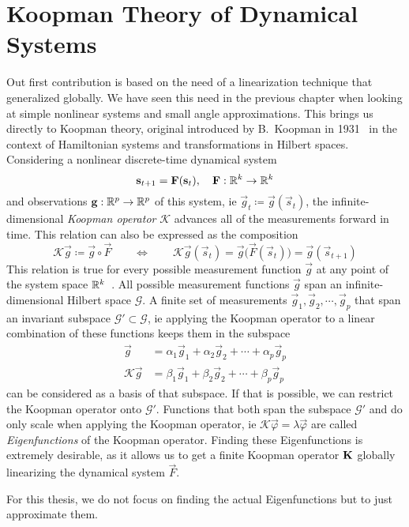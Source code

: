 \chapter{Koopman Theory of Dynamical Systems}
\label{c:koopmanTheoryOfDynamicalSystems}



Out first contribution is based on the need of a linearization technique that generalized globally. We have seen this need in the previous chapter when looking at simple nonlinear systems and small angle approximations. This brings us directly to Koopman theory, original introduced by B.~Koopman in 1931~\cite{koopmanHamiltonianSystemsTransformation1931} in the context of Hamiltonian systems and transformations in Hilbert spaces. Considering a nonlinear discrete-time dynamical system
\begin{equation*}
	\boldsymbol{\mathrm{s}}_{t + 1} = \boldsymbol{\mathrm{F}}(\boldsymbol{\mathrm{s}}_t),\quad \boldsymbol{\mathrm{F}} : \mathbb{R}^k \to \mathbb{R}^k
\end{equation*}
and observations \( \boldsymbol{\mathrm{g}} : \mathbb{R}^p \to \mathbb{R}^p \) of this system, \ac{ie} \( \vec{g}_t \coloneqq \vec{g}(\vec{s}_t) \), the infinite-dimensional \emph{Koopman operator} \(\mathcal{K}\) advances all of the measurements forward in time. This relation can also be expressed as the composition
\begin{equation*}
	\mathcal{K} \vec{g} \coloneqq \vec{g} \circ \vec{F} \qquad\iff\qquad \mathcal{K} \vec{g}(\vec{s}_t) = \vec{g}\big( \vec{F}(\vec{s}_t) \big) = \vec{g}(\vec{s}_{t + 1})
\end{equation*}
This relation is true for every possible measurement function \( \vec{g} \) at any point of the system space \( \mathbb{R}^k \)~\cite{bruntonKoopmanInvariantSubspaces2016}. All possible measurement functions \( \vec{g} \) span an infinite-dimensional Hilbert space \( \mathcal{G} \). A finite set of measurements \( \vec{g}_1, \vec{g}_2, \cdots, \vec{g}_p \) that span an invariant subspace \( \mathcal{G}' \subset \mathcal{G} \), \ac{ie} applying the Koopman operator to a linear combination of these functions keeps them in the subspace
\begin{align*}
	\vec{g} &= \alpha_1 \vec{g}_1 + \alpha_2 \vec{g}_2 + \cdots + \alpha_p \vec{g}_p \\
	\mathcal{K} \vec{g} &= \beta_1 \vec{g}_1 + \beta_2 \vec{g}_2 + \cdots + \beta_p \vec{g}_p
\end{align*}
can be considered as a basis of that subspace. If that is possible, we can restrict the Koopman operator onto \( \mathcal{G}' \). Functions that both span the subspace \(\mathcal{G}'\) and do only scale when applying the Koopman operator, \ac{ie} \( \mathcal{K} \vec{\varphi} = \lambda \vec{\varphi} \) are called \emph{Eigenfunctions} of the Koopman operator. Finding these Eigenfunctions is extremely desirable, as it allows us to get a finite Koopman operator \( \boldsymbol{\mathrm{K}} \) globally linearizing the dynamical system \( \vec{F} \).

For this thesis, we do not focus on finding the actual Eigenfunctions but to just approximate them.
